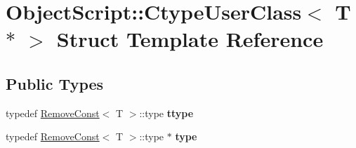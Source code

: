 \hypertarget{struct_object_script_1_1_ctype_user_class_3_01_t_01_5_01_4}{}\section{Object\+Script\+:\+:Ctype\+User\+Class$<$ T $\ast$ $>$ Struct Template Reference}
\label{struct_object_script_1_1_ctype_user_class_3_01_t_01_5_01_4}
\subsection*{Public Types}
\begin{DoxyCompactItemize}
\item 
typedef \hyperlink{struct_object_script_1_1_remove_const}{Remove\+Const}$<$ T $>$\+::type {\bfseries ttype}\hypertarget{struct_object_script_1_1_ctype_user_class_3_01_t_01_5_01_4_a2e6c1e4dbfb07c5ec5f1408c338251f7}{}\label{struct_object_script_1_1_ctype_user_class_3_01_t_01_5_01_4_a2e6c1e4dbfb07c5ec5f1408c338251f7}

\item 
typedef \hyperlink{struct_object_script_1_1_remove_const}{Remove\+Const}$<$ T $>$\+::type $\ast$ {\bfseries type}\hypertarget{struct_object_script_1_1_ctype_user_class_3_01_t_01_5_01_4_a7ee8e4d6f67a3cdc4f567e46b63fa584}{}\label{struct_object_script_1_1_ctype_user_class_3_01_t_01_5_01_4_a7ee8e4d6f67a3cdc4f567e46b63fa584}

\end{DoxyCompactItemize}
